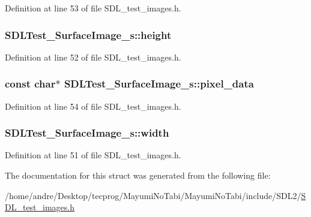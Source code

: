 Definition at line 53 of file S\-D\-L\-\_\-test\-\_\-images.\-h.

\hypertarget{struct_s_d_l_test___surface_image__s_a310092874695556e4b7f1f63aec24213}{
\subsubsection[{height}]{ S\-D\-L\-Test\-\_\-\-Surface\-Image\-\_\-s\-::height}}\label{struct_s_d_l_test___surface_image__s_a310092874695556e4b7f1f63aec24213}


Definition at line 52 of file S\-D\-L\-\_\-test\-\_\-images.\-h.

\hypertarget{struct_s_d_l_test___surface_image__s_acf2d3006bea5690f564d3003d1512fa7}{
\subsubsection[{pixel\-\_\-data}]{\setlength{\rightskip}{0pt plus 5cm}const char$\ast$ S\-D\-L\-Test\-\_\-\-Surface\-Image\-\_\-s\-::pixel\-\_\-data}}\label{struct_s_d_l_test___surface_image__s_acf2d3006bea5690f564d3003d1512fa7}


Definition at line 54 of file S\-D\-L\-\_\-test\-\_\-images.\-h.

\hypertarget{struct_s_d_l_test___surface_image__s_a3cbacf6b015a22832ab4d3f509719609}{
\subsubsection[{width}]{ S\-D\-L\-Test\-\_\-\-Surface\-Image\-\_\-s\-::width}}\label{struct_s_d_l_test___surface_image__s_a3cbacf6b015a22832ab4d3f509719609}


Definition at line 51 of file S\-D\-L\-\_\-test\-\_\-images.\-h.



The documentation for this struct was generated from the following file\-:\begin{DoxyCompactItemize}
\item 
/home/andre/\-Desktop/tecprog/\-Mayumi\-No\-Tabi/\-Mayumi\-No\-Tabi/include/\-S\-D\-L2/\hyperlink{_s_d_l__test__images_8h}{S\-D\-L\-\_\-test\-\_\-images.\-h}\end{DoxyCompactItemize}
